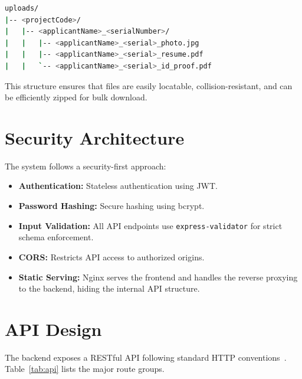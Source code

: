 \begin{lstlisting}[float=htbp, language=bash, caption={Uploads directory structure.}]
uploads/
|-- <projectCode>/
|   |-- <applicantName>_<serialNumber>/
|   |   |-- <applicantName>_<serial>_photo.jpg
|   |   |-- <applicantName>_<serial>_resume.pdf
|   |   `-- <applicantName>_<serial>_id_proof.pdf
\end{lstlisting}

This structure ensures that files are easily locatable, collision-resistant, and can be efficiently zipped for bulk download.

\section{Security Architecture}

The system follows a security-first approach:

\begin{itemize}
  \item \textbf{Authentication:} Stateless authentication using JWT.
  \item \textbf{Password Hashing:} Secure hashing using bcrypt.
  \item \textbf{Input Validation:} All API endpoints use \texttt{express-validator} for strict schema enforcement.
  \item \textbf{CORS:} Restricts API access to authorized origins.
  \item \textbf{Static Serving:} Nginx serves the frontend and handles the reverse proxying to the backend, hiding the internal API structure.
\end{itemize}

\section{API Design}

The backend exposes a RESTful API following standard HTTP conventions~\cite{Fielding2000}. Table~\ref{tab:api} lists the major route groups.

